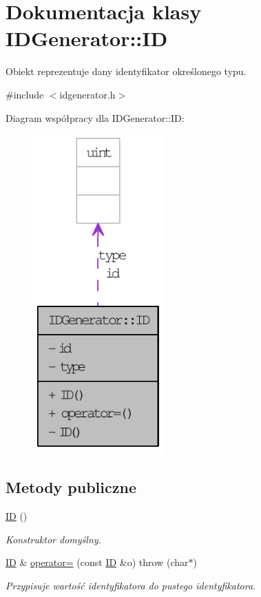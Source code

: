 \hypertarget{classIDGenerator_1_1ID}{
\section{Dokumentacja klasy IDGenerator::ID}
\label{classIDGenerator_1_1ID}
}


Obiekt reprezentuje dany identyfikator określonego typu.  




{\ttfamily \#include $<$idgenerator.h$>$}



Diagram współpracy dla IDGenerator::ID:\nopagebreak
\begin{figure}[H]
\begin{center}
\leavevmode
\includegraphics[width=142pt]{classIDGenerator_1_1ID__coll__graph}
\end{center}
\end{figure}
\subsection*{Metody publiczne}
\begin{DoxyCompactItemize}
\item 
\hyperlink{classIDGenerator_1_1ID_aadc91850d9ea6ba775aa07b7f214a7a5}{ID} ()
\begin{DoxyCompactList}\small\item\em Konstruktor domyślny. \item\end{DoxyCompactList}\item 
\hyperlink{classIDGenerator_1_1ID}{ID} \& \hyperlink{classIDGenerator_1_1ID_a239f6a12bb0b8ddf74bc5a8e2fdffdf4}{operator=} (const \hyperlink{classIDGenerator_1_1ID}{ID} \&o)  throw (char$\ast$)
\begin{DoxyCompactList}\small\item\em Przypisuje wartość identyfikatora do pustego identyfikatora. \item\end{DoxyCompactList}\end{DoxyCompactItemize}
